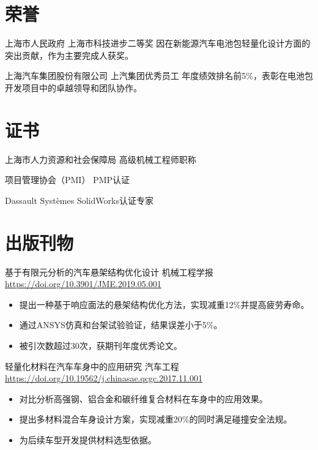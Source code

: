 \documentclass[a4paper, serif, 10pt]{moderncv}
\begin{document}
\section{荣誉}

        {上海市人民政府}
        {上海市科技进步二等奖}
        {}
        {}
        {因在新能源汽车电池包轻量化设计方面的突出贡献，作为主要完成人获奖。}

        {上海汽车集团股份有限公司}
        {上汽集团优秀员工}
        {}
        {}
        {年度绩效排名前5\%，表彰在电池包开发项目中的卓越领导和团队协作。}
\section{证书}

        {上海市人力资源和社会保障局}
        {高级机械工程师职称}
        {}
        {}
        {}

        {项目管理协会（PMI）}
        {PMP认证}
        {}
        {}
        {}

        {Dassault Systèmes}
        {SolidWorks认证专家}
        {}
        {}
        {}
\section{出版刊物}

        {基于有限元分析的汽车悬架结构优化设计}
        {机械工程学报}
        {\url{https://doi.org/10.3901/JME.2019.05.001}}
        {}
        {\begin{itemize}
\item 提出一种基于响应面法的悬架结构优化方法，实现减重12\%并提高疲劳寿命。
\item 通过ANSYS仿真和台架试验验证，结果误差小于5\%。
\item 被引次数超过30次，获期刊年度优秀论文。
\end{itemize}}

        {轻量化材料在汽车车身中的应用研究}
        {汽车工程}
        {\url{https://doi.org/10.19562/j.chinasae.qcgc.2017.11.001}}
        {}
        {\begin{itemize}
\item 对比分析高强钢、铝合金和碳纤维复合材料在车身中的应用效果。
\item 提出多材料混合车身设计方案，实现减重20\%的同时满足碰撞安全法规。
\item 为后续车型开发提供材料选型依据。
\end{itemize}}
\end{document}
